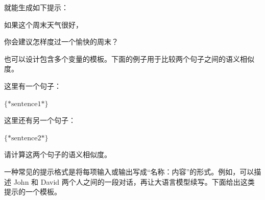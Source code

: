 \noindent 就能生成如下提示：

\vspace{0.5em}
\begin{tcolorbox}

\hspace{2em} 如果这个周末天气很好，

\hspace{2em} 你会建议怎样度过一个愉快的周末？

\hspace{2em} \underline{\hspace{2em}}
\end{tcolorbox}
\vspace{0.5em}

也可以设计包含多个变量的模板。下面的例子用于比较两个句子之间的语义相似度。

\vspace{0.5em}
\begin{tcolorbox}

\hspace{2em} 这里有一个句子：

\hspace{2em} $\{*\mathrm{sentence1}*\}$

\hspace{2em} 这里还有另一个句子：

\hspace{2em} $\{*\mathrm{sentence2}*\}$

\vspace{0.3em}

\hspace{2em} 请计算这两个句子的语义相似度。

\hspace{2em} \underline{\hspace{2em}}
\end{tcolorbox}
\vspace{0.5em}

一种常见的提示格式是将每项输入或输出写成“名称：内容”的形式。例如，可以描述 John 和 David 两个人之间的一段对话，再让大语言模型续写。下面给出这类提示的一个模板。

